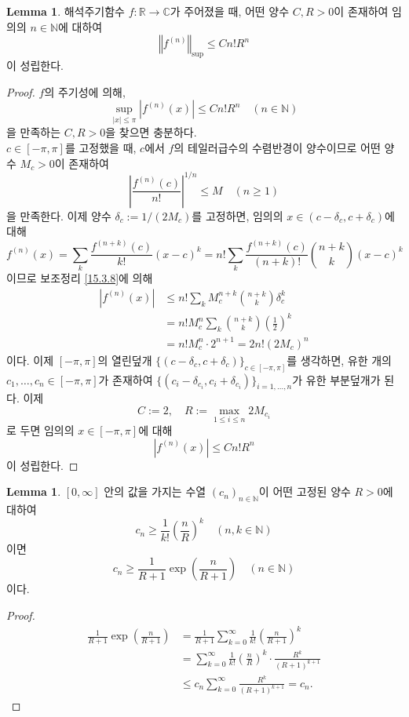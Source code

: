 \documentclass[11pt]{book}
\numberwithin{equation}{chapter}
\def\NN{\mathbb{N}}
\def\RR{\mathbb{R}}
\def\CC{\mathbb{C}}
\newcommand{\abs}[1]{\left\vert#1\right\vert}
\newcommand{\norm}[1]{\left\Vert#1\right\Vert}
\newcommand{\paren}[1]{\left(#1\right)}
\theoremstyle{definition}
\newtheorem{lem}[thm]{Lemma}
\begin{document}
\begin{lem} \label{15.3.9}
    해석주기함수 \(f : \RR \to \CC\)가 주어졌을 때, 어떤 양수 \(C, R > 0\)이 존재하여 임의의 \(n \in \NN\)에 대하여
    \[
        \norm{f^{(n)}}_{\sup} \le C n! R^n
    \]
    이 성립한다.
\end{lem}
\begin{proof}
    \(f\)의 주기성에 의해,
    \[
        \sup_{\abs{x} \le \pi} \abs{f^{(n)}(x)} \le C n! R^n \quad (n \in \NN)
    \]
    을 만족하는 \(C, R > 0\)을 찾으면 충분하다.\\
    \(c \in [-\pi, \pi]\)를 고정했을 때, \(c\)에서 \(f\)의 테일러급수의 수렴반경이 양수이므로 어떤 양수 \(M_c > 0\)이 존재하여
    \[
        \abs{\frac{f^{(n)}(c)}{n!}}^{1/n} \le M \quad (n \ge 1)
    \]
    을 만족한다. 이제 양수 \(\delta_c := 1/(2M_c)\)를 고정하면, 임의의 \(x \in (c - \delta_c, c + \delta_c)\)에 대해
    \[
        f^{(n)}(x) = \sum_k \frac{f^{(n+k)}(c)}{k!} (x  - c)^k = n! \sum_k \frac{f^{(n+k)}(c)}{(n+k)!} \binom{n+k}{k} (x  - c)^k
    \]
    이므로 보조정리 \ref{15.3.8}에 의해
    \begin{align*}
        \abs{f^{(n)}(x)} &\le n! \sum_{k} M_c^{n+k}\binom{n+k}{k} \delta_c^k\\
        &= n! M_c^n \sum_k \binom{n+k}{k} \paren{\frac{1}{2}}^k\\
        &= n! M_c^n \cdot 2^{n+1} = 2n! (2M_c)^n
    \end{align*}
    이다. 이제 \([-\pi, \pi]\)의 열린덮개 \(\{(c - \delta_c, c + \delta_c)\}_{c \in [-\pi, \pi]}\)를 생각하면, 유한 개의 \(c_1, \ldots, c_n \in [-\pi, \pi]\)가 존재하여 \(\{(c_i - \delta_{c_i}, c_i + \delta_{c_i})\}_{i=1, \ldots, n}\)가 유한 부분덮개가 된다. 이제
    \[
        C := 2, \quad R := \max_{1 \le i \le n} 2M_{c_i}
    \]
    로 두면 임의의 \(x \in [-\pi, \pi]\)에 대해
    \[
        \abs{f^{(n)}(x)} \le Cn!R^n
    \]
    이 성립한다.
\end{proof}

\begin{lem} \label{15.3.10}
    \([0, \infty]\) 안의 값을 가지는 수열 \((c_n)_{n \in \NN}\)이 어떤 고정된 양수 \(R > 0\)에 대하여
    \[
        c_n \ge \frac{1}{k!} \paren{\frac{n}{R}}^k \quad (n, k \in \NN)
    \]
    이면
    \[
        c_n \ge \frac{1}{R+1} \exp \paren{\frac{n}{R+1}} \quad (n \in \NN)
    \]
    이다.
\end{lem}
\begin{proof}
    \begin{align*}
        \frac{1}{R+1} \exp \paren{\frac{n}{R+1}} &= \frac{1}{R+1} \sum_{k=0}^\infty \frac{1}{k!} \paren{\frac{n}{R+1}}^k\\
        &= \sum_{k=0}^\infty \frac{1}{k!} \paren{\frac{n}{R}}^k \cdot \frac{R^k}{(R+1)^{k+1}}\\
        &\le c_n \sum_{k=0}^\infty \frac{R^k}{(R+1)^{k+1}} = c_n.
    \end{align*}
\end{proof}
\end{document}
